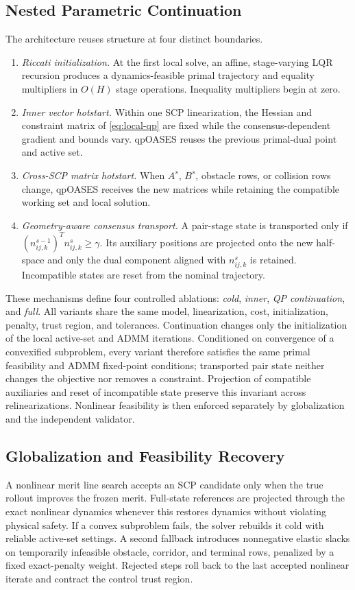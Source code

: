 \documentclass[letterpaper,10pt,conference]{ieeeconf}
\begin{document}
\subsection{Nested Parametric Continuation}
The architecture reuses structure at four distinct boundaries.
\begin{enumerate}
    \item \emph{Riccati initialization.} At the first local solve, an affine,
    stage-varying LQR recursion produces a dynamics-feasible primal trajectory
    and equality multipliers in $O(H)$ stage operations. Inequality multipliers
    begin at zero.
    \item \emph{Inner vector hotstart.} Within one SCP linearization, the
    Hessian and constraint matrix of \eqref{eq:local-qp} are fixed while the
    consensus-dependent gradient and bounds vary. qpOASES reuses the previous
    primal-dual point and active set.
    \item \emph{Cross-SCP matrix hotstart.} When $A^s$, $B^s$, obstacle rows,
    or collision rows change, qpOASES receives the new matrices while retaining
    the compatible working set and local solution.
    \item \emph{Geometry-aware consensus transport.} A pair-stage state is
    transported only if
    $(n^{s-1}_{ij,k})^Tn^s_{ij,k}\ge\gamma$. Its auxiliary positions are
    projected onto the new half-space and only the dual component aligned with
    $n^s_{ij,k}$ is retained. Incompatible states are reset from the nominal
    trajectory.
\end{enumerate}
These mechanisms define four controlled ablations: \emph{cold}, \emph{inner},
\emph{QP continuation}, and \emph{full}. All variants share the same model,
linearization, cost, initialization, penalty, trust region, and tolerances.
Continuation changes only the initialization of the local active-set and ADMM
iterations. Conditioned on convergence of a convexified subproblem, every
variant therefore satisfies the same primal feasibility and ADMM fixed-point
conditions; transported pair state neither changes the objective nor removes a
constraint. Projection of compatible auxiliaries and reset of incompatible
state preserve this invariant across relinearizations. Nonlinear feasibility is
then enforced separately by globalization and the independent validator.

\subsection{Globalization and Feasibility Recovery}
A nonlinear merit line search accepts an SCP candidate only when the true
rollout improves the frozen merit. Full-state references are projected through
the exact nonlinear dynamics whenever this restores dynamics without violating
physical safety. If a convex subproblem fails, the solver rebuilds it cold
with reliable active-set settings. A second fallback introduces nonnegative
elastic slacks on temporarily infeasible obstacle, corridor, and terminal
rows, penalized by a fixed exact-penalty weight. Rejected steps roll back to the
last accepted nonlinear iterate and contract the control trust region.
\end{document}
